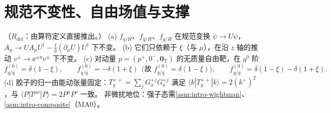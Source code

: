 \section{规范不变性、自由场值与支撑}\label{sec:pdf-properties}

\begin{proposition}\label{prop:pdf-invariance}
（$R_{\mathrm{def}}$：由算符定义直接推出。）
(a) $f_{q/H}$、$f_{\bar q/H}$、$f_{g/H}$ 在规范变换 $\psi\to U\psi$，$A_\mu\to UA_\mu U^\dagger-\frac{\ii}{g}(\partial_\mu U)U^\dagger$ 下不变。
(b) 它们只依赖于 $\xi$（与 $\mu$），在沿 $z$ 轴的推动 $v^\pm\to\ee^{\pm\eta}v^\pm$ 下不变。
(c) 对动量 $p=(p^+,0^-,\bm 0_{\mathrm T})$ 的无质量自由靶，在 $g^0$ 阶
\begin{equation}\label{eq:pdf-free}
f^{(0)}_{q/q}=\delta(1-\xi),\qquad f^{(0)}_{q/\bar q}=-\delta(1+\xi)\ \ \big(\text{故 }f^{(0)}_{\bar q/\bar q}=\delta(1-\xi)\big),\qquad
f^{(0)}_{g/g}=\delta(1-\xi)-\delta(1+\xi).
\end{equation}
(d) 胶子的归一由能动张量固定：$T^{++}_g=\sum_jG^{+j}_aG^{+j}_a$ 满足 $\langle k|T^{++}_g|k\rangle=2(k^+)^2$，与 $\langle P|T^{\mu\nu}|P\rangle=2P^\mu P^\nu$ 一致。
非微扰地位：强子态需\cref{asm:intro-wightman}、\cref{asm:intro-composite}（MA0）。
\end{proposition}

